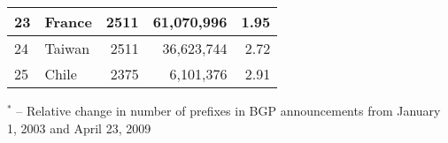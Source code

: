 \begin{table}[p]
\begin{center}
\begin{tabular}{|l||l|r|r|r|}
23      &       France 			&       2511    &       61,070,996      & 1.95			\tabularnewline \hline
24      &       Taiwan 			&       2511    &       36,623,744      & 2.72			\tabularnewline \hline
25      &       Chile  			&       2375    &       6,101,376       & 2.91			\tabularnewline \hline
	\end{tabular}
	\end{center}
	
	\small	$^{*}$ -- Relative change in number of prefixes in BGP announcements from January 1, 2003 and April 23, 2009
\end{table}

